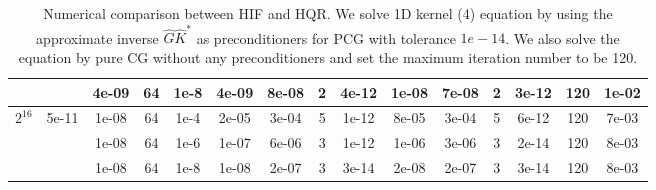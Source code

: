 \documentclass[11pt]{article}
\begin{document}
\begin{table}[!htbp]
\begin{tabular}{|c|c|c|c|c|c|c|c|c|c|c|c|c|c|c|}
~ & ~ & 4e-09 & 64 & 1e-8 & 4e-09 & 8e-08 & 2 & 4e-12 & 1e-08 & 7e-08 & 2 & 3e-12 & 120 & 1e-02\\
\hline
$2^{16}$ & 5e-11 & 1e-08 & 64 & 1e-4 & 2e-05 & 3e-04 & 5 & 1e-12 & 8e-05 & 3e-04 & 5 & 6e-12 & 120 & 7e-03\\
~ & ~ & 1e-08 & 64 & 1e-6 & 1e-07 & 6e-06 & 3 & 1e-12 & 1e-06 & 3e-06 & 3 & 2e-14 & 120 & 8e-03\\
~ & ~ & 1e-08 & 64 & 1e-8 & 1e-08 & 2e-07 & 3 & 3e-14 & 2e-08 & 2e-07 & 3 & 3e-14 & 120 & 8e-03\\


\end{tabular}

\caption{Numerical comparison between HIF and HQR. We solve 1D kernel (4) equation by using the approximate inverse $\hat{G}\hat{K}^{*}$ as preconditioners for PCG with tolerance $1e-14$. We also solve the equation by pure CG without any preconditioners and set the maximum iteration number to be 120.}
\label{1d-k4}
\end{table}
\end{document}

